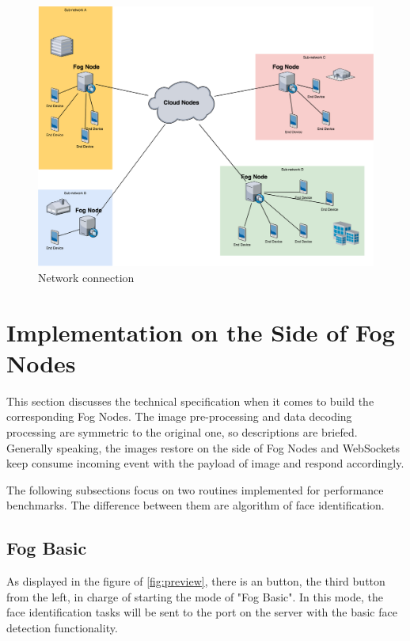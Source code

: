 \begin{figure}
    \centering
    \includegraphics[width=\textwidth]{images/network.png}
    \caption{Network connection}
    \label{fig:network}
\end{figure}


\section{Implementation on the Side of Fog Nodes}
This section discusses the technical specification when it comes to build the corresponding Fog Nodes. The image pre-processing and data decoding processing are symmetric to the original one, so descriptions are briefed. Generally speaking, the images restore on the side of Fog Nodes and WebSockets keep consume incoming event with the payload of image and respond accordingly.

The following subsections focus on two routines implemented for performance benchmarks. The difference between them are algorithm of face identification.

\subsection{Fog Basic}
As displayed in the figure of \ref{fig:preview}, there is an button, the third button from the left, in charge of starting the mode of "Fog Basic". In this mode, the face identification tasks will be sent to the port on the server with the basic face detection functionality. 


